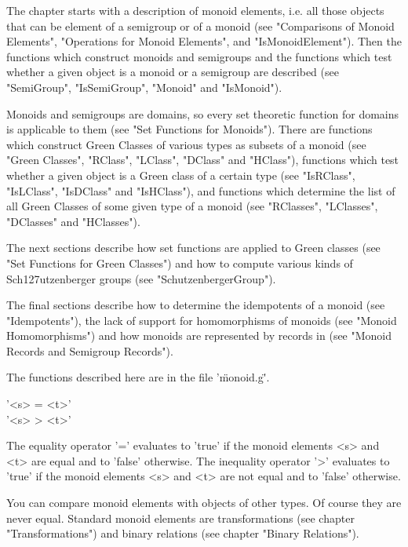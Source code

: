 The chapter starts with a description  of monoid elements, i.e. all those
objects that  can be  element   of  a semigroup  or    of a monoid   (see
"Comparisons of Monoid  Elements", "Operations for Monoid  Elements", and
"IsMonoidElement").  Then the    functions which  construct   monoids and
semigroups  and the  functions which  test  whether  a given  object is a
monoid or a    semigroup are described   (see "SemiGroup", "IsSemiGroup",
"Monoid" and "IsMonoid").

Monoids  and semigroups are domains, so  every set theoretic function for
domains is applicable  to them (see  "Set Functions for Monoids").  There
are functions which  construct Green Classes of  various types as subsets
of   a  monoid (see "Green  Classes",    "RClass", "LClass", "DClass" and
"HClass"), functions  which test whether a given  object is a Green class
of   a certain    type (see   "IsRClass",    "IsLClass", "IsDClass"   and
"IsHClass"), and functions which determine the  list of all Green Classes
of some  given type of  a monoid (see  "RClasses", "LClasses", "DClasses"
and "HClasses").

The next sections describe how set functions are applied to Green classes
(see "Set Functions for Green Classes")  and how to compute various kinds
of Sch\accent127utzenberger groups (see "SchutzenbergerGroup").

The final sections describe how to determine the  idempotents of a monoid
(see   "Idempotents"), the lack  of  support for homomorphisms of monoids
(see "Monoid Homomorphisms") and how  monoids are represented by  records
in {\GAP} (see "Monoid Records and Semigroup Records").

The functions described here are in the file '\"monoid.g\"'.

%
%

'<s> = <t>' \\
'<s> \<> <t>'

The equality operator '=' evaluates to 'true'  if the monoid elements <s>
and <t> are   equal and to 'false'  otherwise.    The inequality operator
'\<>' evaluates to  'true'  if the monoid elements   <s> and <t>  are not
equal and to 'false' otherwise.

You can compare monoid  elements with objects of  other types.  Of course
they are never equal.  Standard monoid  elements are transformations (see
chapter "Transformations")   and binary relations   (see chapter  "Binary
Relations").

